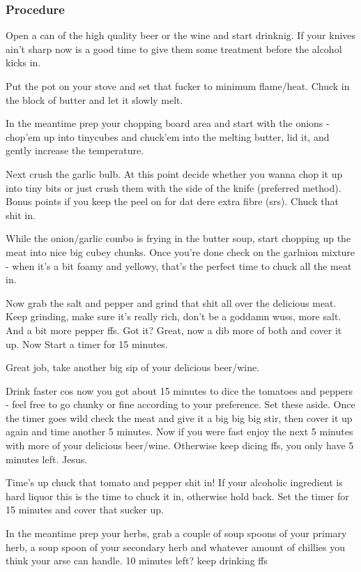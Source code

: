 \documentclass[10pt]{article}
\begin{document}
\subsubsection{Procedure}%
Open a can of the high quality beer or the wine and start drinknig. If your knives ain't sharp now is a good time to give them some treatment before the alcohol kicks in.\par
Put the pot on your stove and set that fucker to minimum flame/heat. Chuck in the block of butter and let it slowly melt.\par
In the meantime prep your chopping board area and start with the onions - chop'em up into tinycubes and chuck'em into the melting butter, lid it, and gently increase the temperature.\par
Next crush the garlic bulb. At this point decide whether you wanna chop it up into tiny bits or just crush them with the side of the knife (preferred method). Bonus points if you keep the peel on for dat dere extra fibre (srs). Chuck that shit in.\par
While the onion/garlic combo is frying in the butter soup, start chopping up the meat into nice big cubey chunks. Once you're done check on the garlnion mixture - when it's a bit foamy and yellowy, that's the perfect time to chuck all the meat in.\par
Now grab the salt and pepper and grind that shit all over the delicious meat. Keep grinding, make sure it's really rich, don't be a goddamn wuss, more salt. And a bit more pepper ffs. Got it? Great, now a dib more of both and cover it up. Now Start a timer for 15 minutes.\par
Great job, take another big sip of your delicious beer/wine.\par
Drink faster cos now you got about 15 minutes to dice the tomatoes and peppers - feel free to go chunky or fine according to your preference. Set these aside. Once the timer goes wild check the meat and give it a big big big stir, then cover it up again and time another 5 minutes. Now if you were fast enjoy the next 5 minutes with more of your delicious beer/wine. Otherwise keep dicing ffs, you only have 5 minutes left. Jesus.\par
Time's up chuck that tomato and pepper shit in! If your alcoholic ingredient is hard liquor this is the time to chuck it in, otherwise hold back. Set the timer for 15 minutes and cover that sucker up.\par
In the meantime prep your herbs, grab a couple of soup spoons of your primary herb, a soup spoon of your secondary herb and whatever amount of chillies you think your arse can handle. 10 minutes left? keep drinking ffs\par
\end{document}
